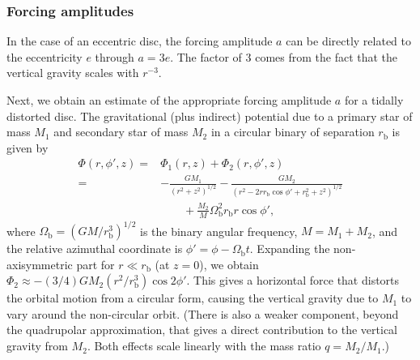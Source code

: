 \documentclass[fleqn,usenatbib]{mnras}
\begin{document}
\subsubsection{Forcing amplitudes}

In the case of an eccentric disc, the forcing amplitude $a$ can be directly related to the eccentricity $e$ through $a=3e$. The factor of $3$ comes from the fact that the vertical gravity scales with $r^{-3}$.

Next, we obtain an estimate of the appropriate forcing amplitude $a$ for a tidally distorted disc. The gravitational (plus indirect) potential due to a primary star of mass $M_1$ and secondary star of mass $M_2$ in a circular binary of separation $r_\text{b}$ is given by \citep{lubow1981vertically}
\begin{align}
  \Phi(r,\phi',z) = & \Phi_1(r,z) + \Phi_2(r,\phi',z) \nonumber \\
  = & - \frac{GM_1}{(r^2 + z^2)^{1/2}} - \frac{GM_2}{(r^2-2 r r_\text{b} \cos{\phi'} + r_\text{b}^2 + z^2)^{1/2}} \nonumber \\
  & \qquad + \frac{M_2}{M} \Omega_\text{b}^2 r_\text{b} r \cos{\phi'},
\end{align}
where $\Omega_\text{b} = (GM/r_\text{b}^3)^{1/2}$ is the binary angular frequency, $M=M_1+M_2$, and the relative azimuthal coordinate is $\phi' = \phi -\Omega_\text{b} t$. Expanding the non-axisymmetric part for $r \ll r_\text{b}$ (at $z=0$), we obtain $\Phi_2 \approx -(3/4)G M_2 (r^2/r_\text{b}^3) \cos{2\phi'}$. This gives a horizontal force that distorts the orbital motion from a circular form, causing the vertical gravity due to $M_1$ to vary around the non-circular orbit. (There is also a weaker component, beyond the quadrupolar approximation, that gives a direct contribution to the vertical gravity from $M_2$. Both effects scale linearly with the mass ratio $q=M_2/M_1$.) 
\end{document}
